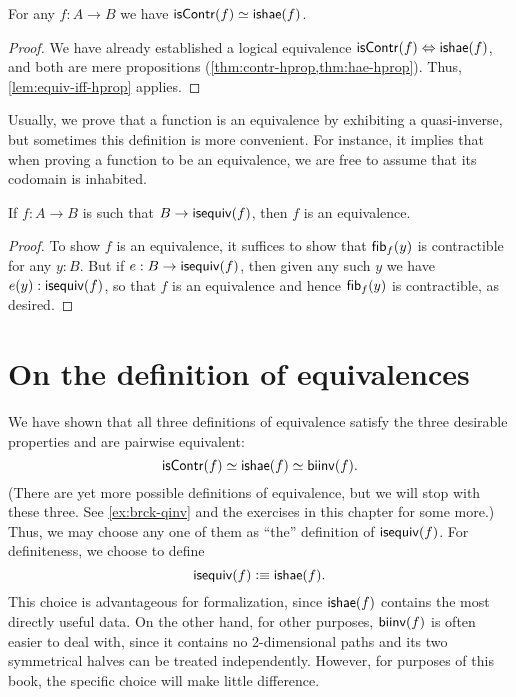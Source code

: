 \begin{thm}\label{thm:equiv-contr-hae}
  For any $f:A\to B$ we have $\mathsf{isContr}(f) \simeq \mathsf{ishae}(f)$.
\end{thm}
\begin{proof}
  We have already established a logical equivalence ${\mathsf{isContr}(f)} \Leftrightarrow {\ensuremath{\mathsf{ishae}}(f)}$, and both are mere propositions (\cref{thm:contr-hprop,thm:hae-hprop}).
  Thus, \cref{lem:equiv-iff-hprop} applies.
\end{proof}

Usually, we prove that a function is an equivalence by exhibiting a quasi-inverse, but sometimes this definition is more convenient.
For instance, it implies that when proving a function to be an equivalence, we are free to assume that its codomain is inhabited.

\begin{cor}\label{thm:equiv-inhabcod}
  If $f:A\to B$ is such that $B\to \mathsf{isequiv}(f)$, then $f$ is an equivalence.
\end{cor}
\begin{proof}
  To show $f$ is an equivalence, it suffices to show that ${\mathsf{fib}}_{f}(y)$ is contractible for any $y:B$.
  But if $e:B\to \mathsf{isequiv}(f)$, then given any such $y$ we have $e(y):\mathsf{isequiv}(f)$, so that $f$ is an equivalence and hence ${\mathsf{fib}}_{f}(y)$ is contractible, as desired.
\end{proof}

%
%
%

\section{On the definition of equivalences}
\label{sec:concluding-remarks}

We have shown that all three definitions of equivalence satisfy the three desirable properties and are pairwise equivalent:
\[ \mathsf{isContr}(f) \simeq \mathsf{ishae}(f) \simeq \mathsf{biinv}(f). \]
(There are yet more possible definitions of equivalence, but we will stop with these three.
See \cref{ex:brck-qinv} and the exercises in this chapter for some more.)
Thus, we may choose any one of them as ``the'' definition of $\mathsf{isequiv} (f)$.
For definiteness, we choose to define
\[ \mathsf{isequiv}(f) \vcentcolon\equiv \mathsf{ishae}(f).\]
%
This choice is advantageous for formalization, since $\mathsf{ishae}(f)$ contains the most directly useful data.
On the other hand, for other purposes, $\mathsf{biinv}(f)$ is often easier to deal with, since it contains no 2-dimensional paths and its two symmetrical halves can be treated independently.
However, for purposes of this book, the specific choice will make little difference.

